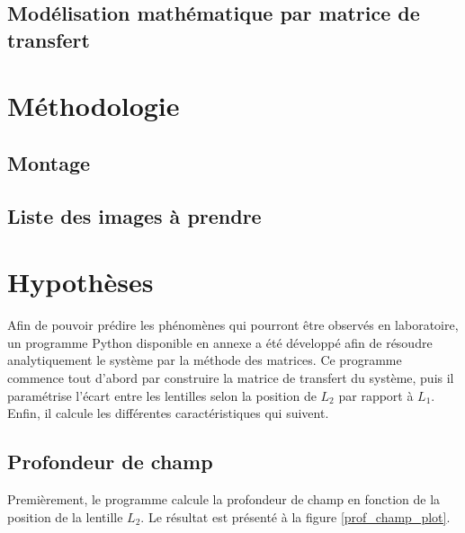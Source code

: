 \documentclass[11pt,letterpaper]{article}
\begin{document}


\subsection{Modélisation mathématique par matrice de transfert}

\section{Méthodologie}

\subsection{Montage}



\subsection{Liste des images à prendre}

\section{Hypothèses}


Afin de pouvoir prédire les phénomènes qui pourront être observés en laboratoire, un
programme Python disponible en annexe a été développé afin de résoudre analytiquement
le système par la méthode des matrices. Ce programme commence tout d'abord par construire
la matrice de transfert du système, puis il paramétrise l'écart entre les lentilles selon
la position de $L_2$ par rapport à $L_1$. Enfin, il calcule les différentes caractéristiques
qui suivent.

\subsection{Profondeur de champ}

Premièrement, le programme calcule la profondeur de champ en fonction de la position de
la lentille $L_2$. Le résultat est présenté à la figure \ref{prof_champ_plot}.
\end{document}
